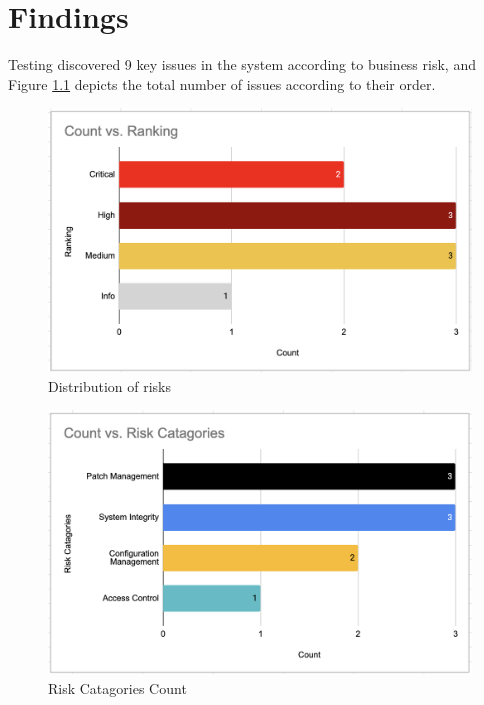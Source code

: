 \chapter{Findings}
Testing discovered 9 key issues in the system according to business risk, and Figure \ref{fig:bar_rankings} depicts the total number of issues according to their order.

\begin{figure}[h!]
\centering
\includegraphics[width=\textwidth]{pics/rankings.png}
\caption{Distribution of risks}\label{fig:bar_rankings}
\end{figure}

\begin{figure}[htp!]
\centering
\includegraphics[width=\textwidth]{pics/risk_cat.png}
\caption{Risk Catagories Count}\label{fig:bar_risks}
\end{figure}


